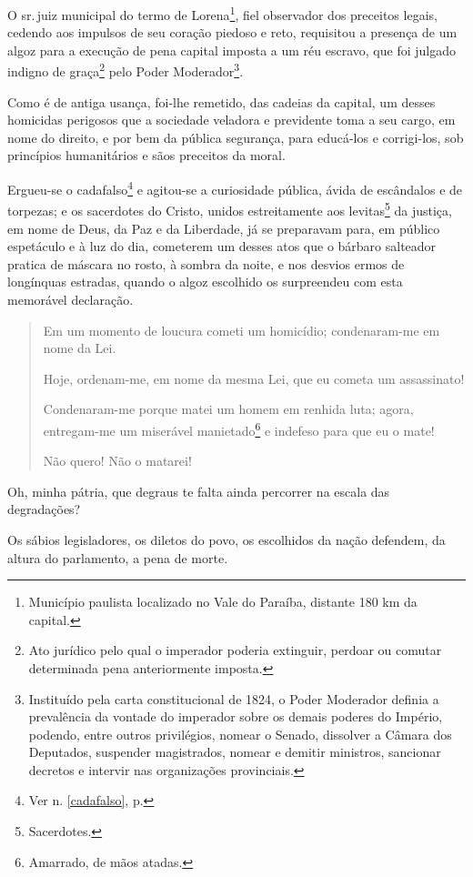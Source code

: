O sr.\,juiz municipal do termo de Lorena\footnote{Município paulista
  localizado no Vale do Paraíba, distante 180 km da capital.}, fiel
observador dos preceitos legais, cedendo aos impulsos de seu coração
piedoso e reto, requisitou a presença de um algoz para a execução de
pena capital imposta a um réu escravo, que foi julgado indigno de
graça\footnote{Ato jurídico pelo qual o imperador poderia extinguir,
  perdoar ou comutar determinada pena anteriormente imposta.} pelo Poder
Moderador\footnote{Instituído pela carta constitucional de 1824, o
  Poder Moderador definia a prevalência da vontade do imperador sobre os
  demais poderes do Império, podendo, entre outros privilégios, nomear o
  Senado, dissolver a Câmara dos Deputados, suspender magistrados,
  nomear e demitir ministros, sancionar decretos e intervir nas
  organizações provinciais.\label{moderador}}.

Como é de antiga usança, foi-lhe remetido, das cadeias da capital, um
desses homicidas perigosos que a sociedade veladora e previdente toma a
seu cargo, em nome do direito, e por bem da pública segurança, para
educá-los e corrigi-los, sob princípios humanitários e sãos preceitos da
moral.

Ergueu-se o cadafalso\footnote{Ver n. \ref{cadafalso}, p. \pageref{cadafalso}} 
e agitou-se a curiosidade pública, ávida de escândalos e de
torpezas; e os sacerdotes do Cristo, unidos estreitamente aos
levitas\footnote{Sacerdotes.} da justiça, em nome de Deus, da Paz e da
Liberdade, já se preparavam para, em público espetáculo e à luz do dia,
cometerem um desses atos que o bárbaro salteador pratica de máscara no
rosto, à sombra da noite, e nos desvios ermos de longínquas estradas,
quando o algoz escolhido os surpreendeu com esta memorável declaração.


\begin{quote}
Em um momento de loucura cometi um homicídio; condenaram-me em nome da
Lei.

Hoje, ordenam-me, em nome da mesma Lei, que eu cometa um assassinato!

Condenaram-me porque matei um homem em renhida luta; agora, entregam-me
um miserável manietado\footnote{Amarrado, de mãos atadas.} e indefeso
para que eu o mate!

Não quero! Não o matarei!
\end{quote}

Oh, minha pátria, que degraus te falta ainda percorrer na escala das
degradações?

Os sábios legisladores, os diletos do povo, os escolhidos da nação
defendem, da altura do parlamento, a pena de morte.

